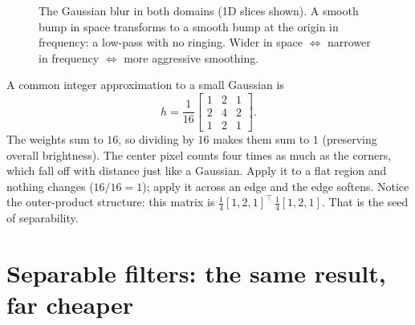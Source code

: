 \begin{figure}[H]
\centering
{}
\caption{The Gaussian blur in both domains (1D slices shown). A smooth bump in
space transforms to a smooth bump at the origin in frequency: a low-pass with no
ringing. Wider in space $\Leftrightarrow$ narrower in frequency $\Leftrightarrow$
more aggressive smoothing.}
\label{ch31:fig-gauss}
\end{figure}

\begin{example}
\label{ch31:ex-gauss3}
A common integer approximation to a small Gaussian is
\[
h = \frac{1}{16}\begin{bmatrix} 1 & 2 & 1\\ 2 & 4 & 2\\ 1 & 2 & 1\end{bmatrix}.
\]
The weights sum to $16$, so dividing by $16$ makes them sum to $1$ (preserving
overall brightness). The center pixel counts four times as much as the corners,
which fall off with distance just like a Gaussian. Apply it to a flat region and
nothing changes ($16/16 = 1$); apply it across an edge and the edge softens.
Notice the outer-product structure: this matrix is
$\frac14[1,2,1]^{\!\top}\,\frac14[1,2,1]$. That is the seed of separability.
\end{example}

\section{Separable filters: the same result, far cheaper}
\label{ch31:separable}

